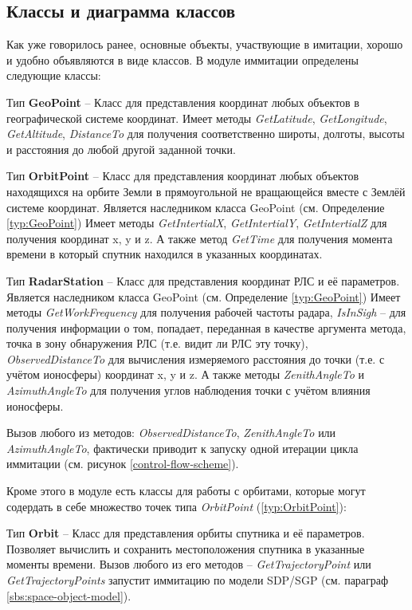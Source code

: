 \subsection{Классы и диаграмма классов}

Как уже говорилось ранее, основные объекты, участвующие в имитации, хорошо и удобно объявляются в виде классов. В
модуле иммитации определены следующие классы:
\begin{mydef} \label{typ:GeoPoint}
Тип \textbf{GeoPoint} -- Класс для представления координат любых объектов в географической системе координат. 
Имеет методы \textit{GetLatitude}, \textit{GetLongitude}, \textit{GetAltitude}, \textit{DistanceTo} для получения соответственно широты, долготы, высоты и расстояния до любой другой заданной точки.
\end{mydef}
\begin{mydef} \label{typ:OrbitPoint}
Тип \textbf{OrbitPoint} -- Класс для представления координат любых объектов находящихся на орбите Земли 
в прямоугольной не вращающейся вместе с Землёй системе координат. Является наследником класса GeoPoint 
(см. Определение \ref{typ:GeoPoint})
Имеет методы \textit{GetIntertialX}, \textit{GetIntertialY}, \textit{GetIntertialZ} для получения 
координат x, y и z. А также метод \textit{GetTime} для получения момента времени в который спутник находился в 
указанных координатах.
\end{mydef}
\begin{mydef} \label{typ:RadarStation}
Тип \textbf{RadarStation} -- Класс для представления координат РЛС и её параметров. Является наследником класса 
GeoPoint (см. Определение \ref{typ:GeoPoint})
Имеет методы \textit{GetWorkFrequency} для получения рабочей частоты радара, \textit{IsInSigh} -- для получения
информации о том, попадает, переданная в качестве аргумента метода, точка в зону обнаружения РЛС (т.е. видит ли РЛС
эту точку), \textit{ObservedDistanceTo} для вычисления измеряемого расстояния до точки (т.е. с учётом ионосферы)
координат x, y и z. А также методы \textit{ZenithAngleTo} и \textit{AzimuthAngleTo} для получения углов наблюдения 
точки с учётом влияния ионосферы.
\end{mydef}

Вызов любого из методов: \textit{ObservedDistanceTo}, \textit{ZenithAngleTo} или \textit{AzimuthAngleTo}, фактически
приводит к запуску одной итерации цикла иммитации (см. рисунок \ref{control-flow-scheme}).

Кроме этого в модуле есть классы для работы с орбитами, которые могут содердать в себе множество точек типа 
\textit{OrbitPoint} (\ref{typ:OrbitPoint}):
\begin{mydef} \label{typ:Orbit}
Тип \textbf{Orbit} -- Класс для представления орбиты спутника и её параметров. Позволяет вычислить и сохранить
местоположения спутника в указанные моменты времени. Вызов любого из его методов -- \textit{GetTrajectoryPoint} 
или \textit{GetTrajectoryPoints} запустит иммитацию по модели SDP/SGP (см. параграф \ref{sbs:space-object-model}).
\end{mydef}